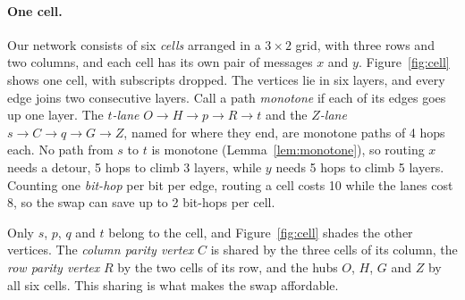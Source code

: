 \documentclass[11pt]{article}
\begin{document}
\paragraph{One cell.} Our network consists of six \emph{cells} arranged in a $3\times2$ grid, with three rows and two columns, and each cell has its own pair of messages $x$ and $y$. Figure~\ref{fig:cell} shows one cell, with subscripts dropped. The vertices lie in six layers, and every edge joins two consecutive layers. Call a path \emph{monotone} if each of its edges goes up one layer. The \emph{$t$-lane} $O\to H\to p\to R\to t$ and the \emph{$Z$-lane} $s\to C\to q\to G\to Z$, named for where they end, are monotone paths of 4 hops each. No path from $s$ to $t$ is monotone (Lemma~\ref{lem:monotone}), so routing $x$ needs a detour, 5 hops to climb 3 layers, while $y$ needs 5 hops to climb 5 layers. Counting one \emph{bit-hop} per bit per edge, routing a cell costs 10 while the lanes cost 8, so the swap can save up to 2 bit-hops per cell.

Only $s$, $p$, $q$ and $t$ belong to the cell, and Figure~\ref{fig:cell} shades the other vertices. The \emph{column parity vertex} $C$ is shared by the three cells of its column, the \emph{row parity vertex} $R$ by the two cells of its row, and the hubs $O$, $H$, $G$ and $Z$ by all six cells. This sharing is what makes the swap affordable.
\end{document}
